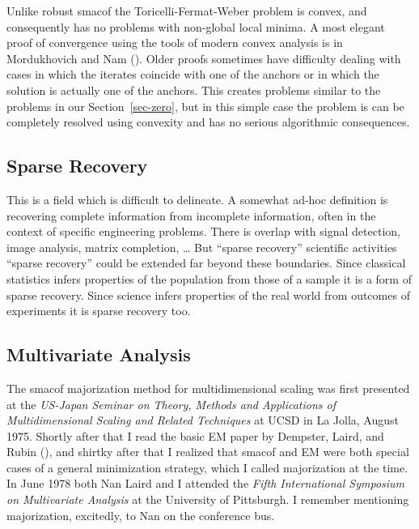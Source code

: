 \documentclass[
  12pt,
  letterpaper,
  DIV=11,
  numbers=noendperiod]{scrartcl}
\theoremstyle{definition}
\theoremstyle{plain}
\theoremstyle{plain}
\theoremstyle{remark}
\begin{document}
Unlike robust smacof the Toricelli-Fermat-Weber problem is convex, and
consequently has no problems with non-global local minima. A most
elegant proof of convergence using the tools of modern convex analysis
is in Mordukhovich and Nam ().
Older proofs sometimes have difficulty dealing with cases in which the
iterates coincide with one of the anchors or in which the solution is
actually one of the anchors. This creates problems similar to the
problems in our Section~\ref{sec-zero}, but in this simple case the
problem is can be completely resolved using convexity and has no serious
algorithmic consequences.

\subsection{Sparse Recovery}\label{sparse-recovery}

This is a field which is difficult to delineate. A somewhat ad-hoc
definition is recovering complete information from incomplete
information, often in the context of specific engineering problems.
There is overlap with signal detection, image analysis, matrix
completion, \ldots{} But ``sparse recovery'' scientific activities
``sparse recovery'' could be extended far beyond these boundaries. Since
classical statistics infers properties of the population from those of a
sample it is a form of sparse recovery. Since science infers properties
of the real world from outcomes of experiments it is sparse recovery
too.

\subsection{Multivariate Analysis}\label{multivariate-analysis}

The smacof majorization method for multidimensional scaling was first
presented at the \emph{US-Japan Seminar on Theory, Methods and
Applications of Multidimensional Scaling and Related Techniques} at UCSD
in La Jolla, August 1975. Shortly after that I read the basic EM paper
by Dempster, Laird, and Rubin
(), and shirtky after that I
realized that smacof and EM were both special cases of a general
minimization strategy, which I called majorization at the time. In June
1978 both Nan Laird and I attended the \emph{Fifth International
Symposium on Multivariate Analysis} at the University of Pittsburgh. I
remember mentioning majorization, excitedly, to Nan on the conference
bus.
\end{document}
